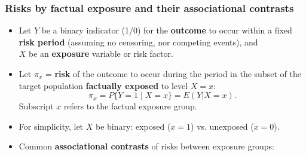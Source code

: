 \documentclass[12pt,dvipsnames,t,aspectratio=169, handout%
]{beamer}
\begin{document}
\begin{frame}
\frametitle{\large Risks by factual exposure and their associational contrasts}
 
\begin{itemize}
\item
Let %
 $Y$ %
 be a binary indicator (1/0)
for the {\bf outcome} to occur within a fixed {\bf risk period}
 (assuming no censoring, nor competing events), 
and \\ $X$ be an {\bf exposure} variable or risk factor. 
\pause
\medskip
\item
Let $\pi_x$ = {\bf risk} of the outcome to occur during the period in the
subset of the target population {\bf factually exposed} to level $X=x$:
$$ \pi_x = P \{ Y=1\mid X=x\} = E(Y|X=x) . $$
Subscript $x$ refers to the factual exposure group.
\pause
\medskip
\item
For simplicity, let $X$ be binary: exposed ($x=1$) vs. unexposed ($x=0$). %
\pause
\medskip
\item
Common \textbf{associational contrasts}
of risks  between exposure groups:
\medskip
{}
\end{itemize}
\end{frame}
\end{document}
